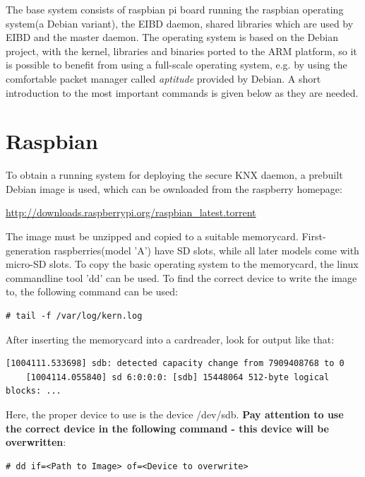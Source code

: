 The base system consists of raspbian pi board running the raspbian operating system(a Debian variant), the EIBD daemon, shared libraries which
are used by EIBD and the master daemon.
The operating system is based on the Debian project, with the kernel, libraries and binaries ported to the ARM platform, so it is possible to benefit from
using a full-scale operating system, e.g. by using the comfortable packet manager called
\textit{aptitude} provided by Debian. A short introduction to the most important commands is given below as they are needed.

\section{Raspbian}

To obtain a running system for deploying the secure KNX daemon, a prebuilt Debian image is used, which can be ownloaded from the raspberry homepage:

\url{http://downloads.raspberrypi.org/raspbian_latest.torrent}

The image must be unzipped and copied to a suitable memorycard. First-generation raspberries(model 'A') have SD slots, while
all later models come with micro-SD slots. To copy the basic operating system to the memorycard, the linux commandline tool 'dd' can
be used. To find the correct device to write the image to, the following command can be used: 

\begin{lstlisting}[style=BashInputStyle,label=lst:kern.log]
    # tail -f /var/log/kern.log
\end{lstlisting}

After inserting the memorycard into a cardreader, look for output like that:

\begin{lstlisting}[style=BashInputStyle]
    [1004111.533698] sdb: detected capacity change from 7909408768 to 0
    [1004114.055840] sd 6:0:0:0: [sdb] 15448064 512-byte logical blocks: ...
\end{lstlisting}

Here, the proper device to use is the device /dev/sdb.
\textbf{Pay attention to use the correct device in the following command - this device will be overwritten}:

\begin{lstlisting}[style=BashInputStyle]
    # dd if=<Path to Image> of=<Device to overwrite>
\end{lstlisting}

